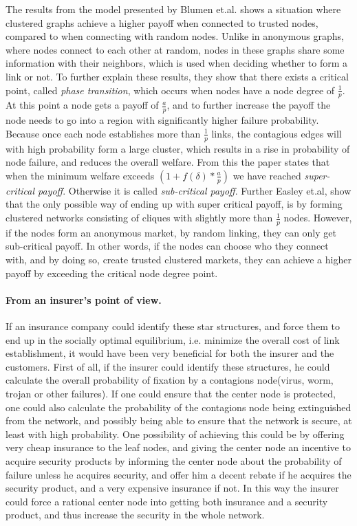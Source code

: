 The results from the model presented by Blumen et.al. shows a situation where clustered graphs achieve a higher payoff when connected to trusted nodes, compared to when connecting with random nodes. Unlike in anonymous graphs, where nodes connect to each other at random, nodes in these graphs share some information with their neighbors, which is used when deciding whether to form a link or not. 
To further explain these results, they show that there exists a critical point, called \textit{phase transition}, which occurs when nodes have a node degree of $\frac{1}{p}$. 
At this point a node gets a payoff of $\frac{a}{p}$, and to further increase the payoff the node needs to go into a region with significantly higher failure probability. 
Because once each node establishes more than $\frac{1}{p}$ links, the contagious edges will with high probability form a large cluster, which results in a rise in probability of node failure, and reduces the overall welfare.
From this the paper states that when the minimum welfare exceeds 
$(1+f(\delta)*\frac{a}{p})$
we have reached \textit{super-critical payoff}. Otherwise it is called \textit{sub-critical payoff}. 
Further Easley et.al, show that the only possible way of ending up with super critical payoff, is by forming clustered networks consisting of cliques with slightly more than $\frac{1}{p}$ nodes. 
However, if the nodes form an anonymous market, by random linking, they can only get sub-critical payoff. 
In other words, if the nodes can choose who they connect with, and by doing so, create trusted clustered markets, they can achieve a higher payoff by exceeding the critical node degree point. 

\paragraph{From an insurer's point of view.}
If an insurance company could identify these star structures, and force them to end up in the socially optimal equilibrium, i.e. minimize the overall cost of link establishment, it would have been very beneficial for both the insurer and the customers.
First of all, if the insurer could identify these structures, he could calculate the overall probability of fixation by a contagions node(virus, worm, trojan or other failures). If one could ensure that the center node is protected, one could also calculate the probability of the contagions node being extinguished from the network, and possibly being able to ensure that the network is secure, at least with high probability. 
One possibility of achieving this could be by offering very cheap insurance to the leaf nodes, and giving the center node an incentive to acquire security products by informing the center node about the probability of failure unless he acquires security, and offer him a decent rebate if he acquires the security product, and a very expensive insurance if not. In this way the insurer could force a rational center node into getting both insurance and a security product, and thus increase the security in the whole network.

